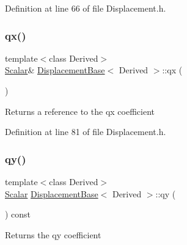 Definition at line 66 of file Displacement.\+h.

\hypertarget{class_displacement_base_a937faf4658311b1b17cd2e3b14ec8b15}{}\label{class_displacement_base_a937faf4658311b1b17cd2e3b14ec8b15} 
\subsubsection{\texorpdfstring{qx()}{qx()}\hspace{0.1cm}{\footnotesize\ttfamily [2/2]}}
{\footnotesize\ttfamily template$<$class Derived$>$ \\
\hyperlink{class_displacement_base_a978caf313131fd9d221a856a2e4a80ad}{Scalar}\& \hyperlink{class_displacement_base}{Displacement\+Base}$<$ Derived $>$\+::qx (\begin{DoxyParamCaption}{ }\end{DoxyParamCaption})\hspace{0.3cm}{\ttfamily [inline]}}

\begin{DoxyReturn}{Returns}
a reference to the {\ttfamily qx} coefficient 
\end{DoxyReturn}


Definition at line 81 of file Displacement.\+h.

\hypertarget{class_displacement_base_af0016b6fed409308e531b4945d60b99a}{}\label{class_displacement_base_af0016b6fed409308e531b4945d60b99a} 
\subsubsection{\texorpdfstring{qy()}{qy()}\hspace{0.1cm}{\footnotesize\ttfamily [1/2]}}
{\footnotesize\ttfamily template$<$class Derived$>$ \\
\hyperlink{class_displacement_base_a978caf313131fd9d221a856a2e4a80ad}{Scalar} \hyperlink{class_displacement_base}{Displacement\+Base}$<$ Derived $>$\+::qy (\begin{DoxyParamCaption}{ }\end{DoxyParamCaption}) const\hspace{0.3cm}{\ttfamily [inline]}}

\begin{DoxyReturn}{Returns}
the {\ttfamily qy} coefficient 
\end{DoxyReturn}


